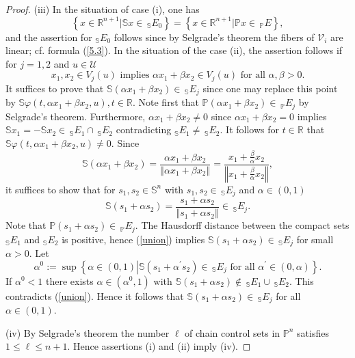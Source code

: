 \documentclass[preprint,12pt]{elsarticle}
\begin{document}
\begin{proof}
(iii) In the situation of case (i), one has%
\[
\left\{  x\in\mathbb{R}^{n+1}\left\vert \mathbb{S}x\in\,_{\mathbb{S}}%
E_{0}\right.  \right\}  =\left\{  x\in\mathbb{R}^{n+1}\left\vert
\mathbb{P}x\in\,_{\mathbb{P}}E\right.  \right\}  ,
\]
and the assertion for $_{\mathbb{S}}E_{0}$ follows since by Selgrade's theorem
the fibers of $\mathcal{V}_{i}$ are linear; cf. formula (\ref{5.3}). In the
situation of the case (ii), the assertion follows if for $j=1,2$ and
$u\in\mathcal{U}$
\[
x_{1},x_{2}\in V_{j}(u)\text{ implies }\alpha x_{1}+\beta x_{2}\in
V_{j}(u)\text{ for all }\alpha,\beta>0.
\]
It suffices to prove that $\mathbb{S}(\alpha x_{1}+\beta x_{2})\in
\,_{\mathbb{S}}E_{j}$ since one may replace this point by $\mathbb{S}%
\varphi(t,\alpha x_{1}+\beta x_{2},u),t\in\mathbb{R}$. Note first that
$\mathbb{P}\left(  \alpha x_{1}+\beta x_{2}\right)  \in\,_{\mathbb{P}}E_{j}$
by Selgrade's theorem. Furthermore, $\alpha x_{1}+\beta x_{2}\not =0$ since
$\alpha x_{1}+\beta x_{2}=0$ implies $\mathbb{S}x_{1}=-\mathbb{S}x_{2}%
\in\,_{\mathbb{S}}E_{1}\cap\,_{\mathbb{S}}E_{2}$ contradicting $_{\mathbb{S}%
}E_{1}\not =\,_{\mathbb{S}}E_{2}$. It follows for $t\in\mathbb{R}$ that
$\mathbb{S}\varphi(t,\alpha x_{1}+\beta x_{2},u)\not =0$. Since%
\[
\mathbb{S}(\alpha x_{1}+\beta x_{2})=\frac{\alpha x_{1}+\beta x_{2}%
}{\left\Vert \alpha x_{1}+\beta x_{2}\right\Vert }=\frac{x_{1}+\frac{\beta
}{\alpha}x_{2}}{\left\Vert x_{1}+\frac{\beta}{\alpha}x_{2}\right\Vert },
\]
it suffices to show that for $s_{1},s_{2}\in\mathbb{S}^{n}$ with $s_{1}%
,s_{2}\in\,_{\mathbb{S}}E_{j}$ and $\alpha\in(0,1)$%
\[
\mathbb{S}(s_{1}+\alpha s_{2})=\frac{s_{1}+\alpha s_{2}}{\left\Vert
s_{1}+\alpha s_{2}\right\Vert }\in\,_{\mathbb{S}}E_{j}.
\]
Note that $\mathbb{P}(s_{1}+\alpha s_{2})\in\,_{\mathbb{P}}E_{j}$. The
Hausdorff distance between the compact sets $_{\mathbb{S}}E_{1}$ and
$_{\mathbb{S}}E_{2}$ is positive, hence (\ref{union}) implies $\mathbb{S}%
(s_{1}+\alpha s_{2})\in\,_{\mathbb{S}}E_{j}$ for small $\alpha>0$. Let%
\[
\alpha^{0}:=\sup\left\{  \alpha\in(0,1)\left\vert \mathbb{S}(s_{1}%
+\alpha^{\prime}s_{2})\in\mathbb{\,}_{\mathbb{S}}E_{j}\text{ for all }%
\alpha^{\prime}\in(0,\alpha)\right.  \right\}  .
\]
If $\alpha^{0}<1$ there exists $\alpha\in(\alpha^{0},1)$ with $\mathbb{S}%
(s_{1}+\alpha s_{2})\not \in \,_{\mathbb{S}}E_{1}\cup\,_{\mathbb{S}}E_{2}$.
This contradicts (\ref{union}). Hence it follows that $\mathbb{S}(s_{1}+\alpha
s_{2})\in\,_{\mathbb{S}}E_{j}$ for all $\alpha\in(0,1)$.

(iv) By Selgrade's theorem the number $\ell$ of chain control sets in
$\mathbb{P}^{n}$ satisfies $1\leq\ell\leq n+1$. Hence assertions (i) and (ii)
imply (iv).
\end{proof}
\end{document}
